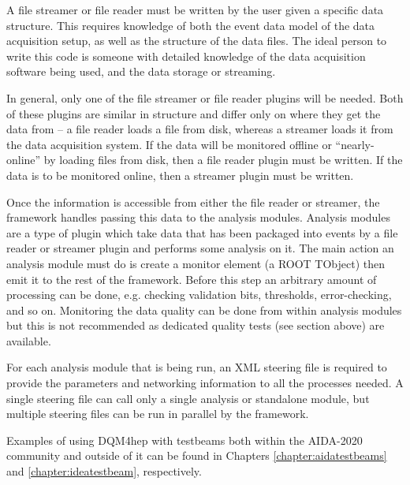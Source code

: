 A file streamer or file reader must be written by the user given a specific data structure. This requires knowledge of both the event data model of the data acquisition setup, as well as the structure of the data files. The ideal person to write this code is someone with detailed knowledge of the data acquisition software being used, and the data storage or streaming. 

In general, only one of the file streamer or file reader plugins will be needed. Both of these plugins are similar in structure and differ only on where they get the data from -- a file reader loads a file from disk, whereas a streamer loads it from the data acquisition system. If the data will be monitored offline or ``nearly-online'' by loading files from disk, then a file reader plugin must be written. If the data is to be monitored online, then a streamer plugin must be written. 

Once the information is accessible from either the file reader or streamer, the framework handles passing this data to the analysis modules. Analysis modules are a type of plugin which take data that has been packaged into events by a file reader or streamer plugin and performs some analysis on it. The main action an analysis module must do is create a monitor element (a ROOT TObject) then emit it to the rest of the framework. Before this step an arbitrary amount of processing can be done, e.g. checking validation bits, thresholds, error-checking, and so on. Monitoring the data quality can be done from within analysis modules but this is not recommended as dedicated quality tests (see section above) are available.

For each analysis module that is being run, an \acrshort{XML} steering file is required to provide the parameters and networking information to all the processes needed. A single steering file can call only a single analysis or standalone module, but multiple steering files can be run in parallel by the framework.

Examples of using \acrshort{DQM4hep} with testbeams both within the \acrshort{AIDA}-2020 community and outside of it can be found in Chapters \ref{chapter:aidatestbeams} and \ref{chapter:ideatestbeam}, respectively.